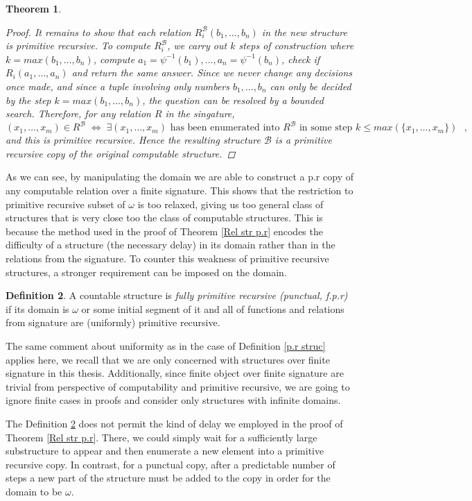 \documentclass{pracalicmgr2025}
\theoremstyle{plain}            %
\newtheorem{theorem}{Theorem}[chapter]
\theoremstyle{remark}           %
\theoremstyle{definition}       %
\newtheorem{definition}[theorem]{Definition}
\begin{document}
\begin{theorem}
\begin{proof}
        It remains to show that each relation $R_i^\mathcal{B}(b_1,\dots, b_n)$ in the new structure is primitive recursive. To compute $R_i^\mathcal{B}$, we carry out $k$ steps of construction where $k = max(b_1,\dots, b_n)$, compute $a_1 = \psi^{-1}(b_1),\dots,a_n=\psi^{-1}(b_n)$, check if $R_i(a_1,\dots, a_n)$ and return the same answer.
       Since we never change any decisions once made, and since a tuple involving only numbers $b_1,\dots, b_n$ can only be decided by the step $k = max(b_1,\dots, b_n)$, the question can be resolved by a bounded search. Therefore, for any relation $R$ in the singature,
        $$
        (x_1,\dots,x_m) \in R^{\mathcal{B}} \;\Longleftrightarrow\;
        \exists (x_1,\dots,x_m) \text{ has been enumerated into $R^{\mathcal{B}}$ in some step $k \le max(\{x_1,\dots,x_m\})$ },
        $$
        and this is primitive recursive. Hence the resulting structure $\mathcal{B}$ is a primitive recursive
        copy of the original computable structure.

    \end{proof}
\end{theorem}
As we can see, by manipulating the domain we are able to construct a p.r copy of any computable relation over a finite signature. This shows that the restriction to primitive recursive subset of $\omega$ is too relaxed, giving us too general class of structures that is very close too the class of computable structures. This is because the method used in the proof of Theorem \ref{Rel str p.r} encodes the difficulty of a structure (the necessary delay) in its domain rather than in the relations from the signature. To counter this weakness of primitive recursive structures, a stronger requirement can be imposed on the domain.
\begin{definition} \cite{3} \label{f.p.r str}
   A countable structure is \emph{fully primitive recursive (punctual, f.p.r)} if its domain
    is $\omega$ or some initial segment of it and all of functions and relations from signature are (uniformly) primitive recursive. 
\end{definition}
The same comment about uniformity as in the case of Definition \ref{p.r struc} applies here, we recall that we are only concerned with structures over finite signature in this thesis. Additionally, since finite object over finite signature are trivial from perspective of computability and primitive recursive, we are going to ignore finite cases in proofs and consider only structures with infinite domains.


 The Definition \ref{f.p.r str} does not permit the kind of delay we employed in the proof of Theorem \ref{Rel str p.r}. There, we could simply wait for a sufficiently large substructure to appear and then enumerate a new element into a primitive recursive copy. In contrast, for a punctual copy, after a predictable number of steps a new part of the structure must be added to the copy in order for the domain to be $\omega$.
\end{document}
